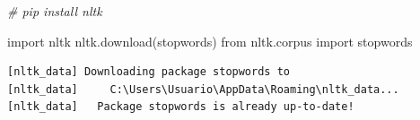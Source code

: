 \documentclass[
  11pt,
  a4paper,
]{article}
\newenvironment{Shaded}{\begin{snugshade}}{\end{snugshade}}
\newcommand{\CommentTok}[1]{\textcolor[rgb]{0.56,0.35,0.01}{\textit{#1}}}
\newcommand{\ImportTok}[1]{#1}
\newcommand{\NormalTok}[1]{#1}
\newcommand{\StringTok}[1]{\textcolor[rgb]{0.31,0.60,0.02}{#1}}
\begin{document}
\begin{Shaded}
\begin{Highlighting}[]
\CommentTok{\# pip install nltk}
\end{Highlighting}
\end{Shaded}

\begin{Shaded}
\begin{Highlighting}[]
\ImportTok{import}\NormalTok{ nltk}
\NormalTok{nltk.download(}\StringTok{\textquotesingle{}stopwords\textquotesingle{}}\NormalTok{)}
\ImportTok{from}\NormalTok{ nltk.corpus }\ImportTok{import}\NormalTok{ stopwords}
\end{Highlighting}
\end{Shaded}

\begin{verbatim}
[nltk_data] Downloading package stopwords to
[nltk_data]     C:\Users\Usuario\AppData\Roaming\nltk_data...
[nltk_data]   Package stopwords is already up-to-date!
\end{verbatim}
\end{document}
